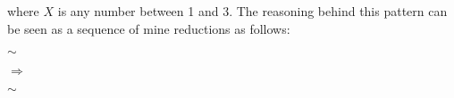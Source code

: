 where $X$ is any number between 1 and 3. The reasoning behind this pattern can be seen as a sequence of mine reductions as follows:

\begin{center}
    \begin{minipage}{0.2\linewidth}\centering{}\end{minipage}{\huge$\sim$}
    \begin{minipage}{0.2\linewidth}\centering{}\end{minipage}{\huge$\Rightarrow$}
    \begin{minipage}{0.2\linewidth}\centering{}\end{minipage}{\huge$\sim$}
    \begin{minipage}{0.2\linewidth}\centering{}\end{minipage}
\end{center}

